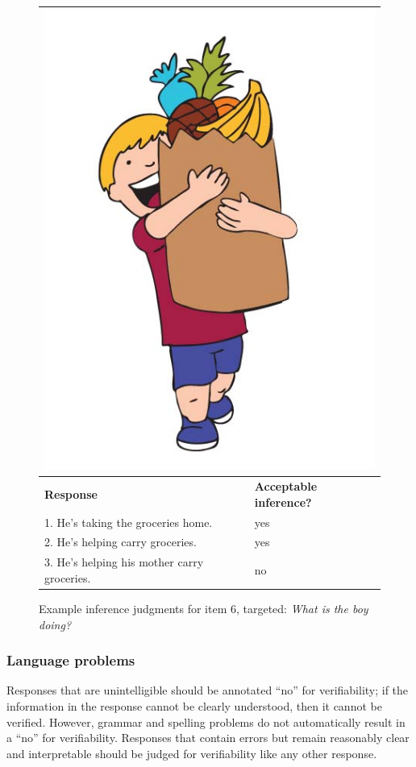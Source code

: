 \documentclass[12pt,notitlepage]{article}
\begin{document}
\begin{figure}[h]
\begin{center}
\begin{tabular}{|p{}|p{}|}
\hline
\multicolumn{2}{|c|}{\includegraphics[width=0.4\columnwidth,trim=0 0 0 -3]{figures/I06.jpg}}\\
\hline
\textbf{Response} & \textbf{Acceptable inference?}\\
\hline
1. He's taking the groceries home. & yes \\
\hline
2. He's helping carry groceries. & yes \\
\hline
3. He's helping his mother carry groceries. & no \\
\hline
\end{tabular}{}
\end{center}
\caption{Example inference judgments for item 6, targeted: \textit{What is the boy doing?}}
\label{fig:carry-groceries}
\end{figure}

\subsubsection{Language problems} Responses that are unintelligible should be annotated ``no'' for verifiability; if the information in the response cannot be clearly understood, then it cannot be verified. However, grammar and spelling problems do not automatically result in a ``no'' for verifiability. Responses that contain errors but remain reasonably clear and interpretable should be judged for verifiability like any other response.
\end{document}
